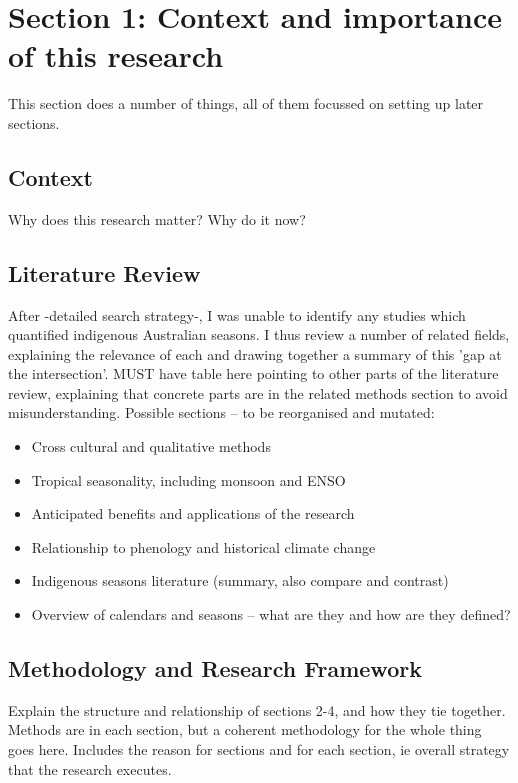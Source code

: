 \chapter{Section 1: Context and importance of this research}
This section does a number of things, all of them focussed on setting up later sections.

\section{Context}
Why does this research matter?  Why do it now?

\section{Literature Review}
After -detailed search strategy-, I was unable to identify any studies which quantified indigenous Australian seasons.
I thus review a number of related fields, explaining the relevance of each and drawing together a summary of this 'gap at the intersection'.
MUST have table here pointing to other parts of the literature review, explaining that concrete parts are in the related methods section to avoid misunderstanding. 
Possible sections – to be reorganised and mutated:

\begin{itemize}
\item Cross cultural and qualitative methods
\item Tropical seasonality, including monsoon and ENSO
\item Anticipated benefits and applications of the research
\item Relationship to phenology and historical climate change
\item Indigenous seasons literature (summary, also compare and contrast)
\item Overview of calendars and seasons – what are they and how are they defined?
\end{itemize}

\section{Methodology and Research Framework}
Explain the structure and relationship of sections 2-4, and how they tie together.  Methods are in each section, but a coherent methodology for the whole thing goes here.  Includes the reason for sections and for each section, ie overall strategy that the research executes.
